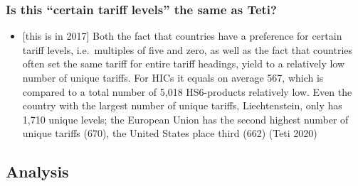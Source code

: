 \documentclass[
  12pt,
]{article}
\providecommand{\tightlist}{%
  \setlength{\itemsep}{0pt}\setlength{\parskip}{0pt}}
\begin{document}
\hypertarget{is-this-certain-tariff-levels-the-same-as-teti}{%
\subsubsection{Is this ``certain tariff levels'' the same as Teti?}\label{is-this-certain-tariff-levels-the-same-as-teti}}

\begin{itemize}
\tightlist
\item
  {[}this is in 2017{]} Both the fact that countries have a preference for certain tariff levels, i.e.~multiples of five and zero, as well as the fact that countries often set the same tariff for entire tariff headings, yield to a relatively low number of unique tariffs. For HICs it equals on average 567, which is compared to a total number of 5,018 HS6-products relatively low. Even the country with the largest number of unique tariffs, Liechtenstein, only has 1,710 unique levels; the European Union has the second highest number of unique tariffs (670), the United States place third (662) (Teti 2020)
\end{itemize}

\hypertarget{analysis}{%
\subsection{Analysis}\label{analysis}}
\end{document}
